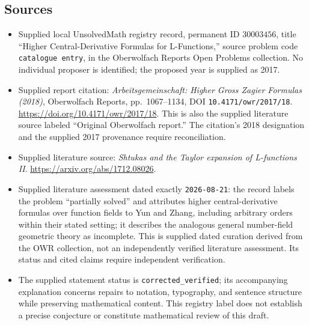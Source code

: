 \documentclass[11pt]{article}
\begin{document}
\subsection{Sources}
\begin{itemize}
\item Supplied local UnsolvedMath registry record, permanent ID \(30003456\), title ``Higher Central-Derivative Formulas for L-Functions,'' source problem code \texttt{catalogue entry}, in the Oberwolfach Reports Open Problems collection. No individual proposer is identified; the proposed year is supplied as 2017.
\item Supplied report citation: \emph{Arbeitsgemeinschaft: Higher Gross Zagier Formulas (2018)}, Oberwolfach Reports, pp.~1067--1134, DOI \texttt{10.4171/owr/2017/18}. \url{https://doi.org/10.4171/owr/2017/18}. This is also the supplied literature source labeled ``Original Oberwolfach report.'' The citation's 2018 designation and the supplied 2017 provenance require reconciliation.
\item Supplied literature source: \emph{Shtukas and the Taylor expansion of L-functions II}. \url{https://arxiv.org/abs/1712.08026}.
\item Supplied literature assessment dated exactly \texttt{2026-08-21}: the record labels the problem ``partially solved'' and attributes higher central-derivative formulas over function fields to Yun and Zhang, including arbitrary orders within their stated setting; it describes the analogous general number-field geometric theory as incomplete. This is supplied dated curation derived from the OWR collection, not an independently verified literature assessment. Its status and cited claims require independent verification.
\item The supplied statement status is \texttt{corrected\_verified}; its accompanying explanation concerns repairs to notation, typography, and sentence structure while preserving mathematical content. This registry label does not establish a precise conjecture or constitute mathematical review of this draft.
\end{itemize}
\end{document}
